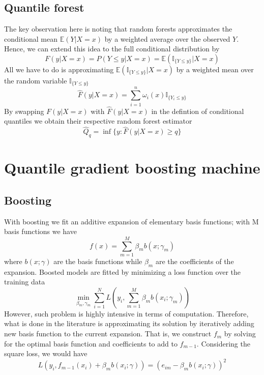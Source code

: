 \subsection{Quantile forest}
The key observation here is noting that random forests approximates the conditional mean $\mathbb{E}(Y|X=x)$ by a weighted average over the observed $Y$. Hence, we can extend this idea to the full conditional distribution by
\begin{equation}
    F(y|X=x)=P(Y\leq y|X=x)=\mathbb{E}(\mathbb{I}_{\{Y\leq y\}}|X=x)
\end{equation}
All we have to do is approximating $\mathbb{E}(\mathbb{I}_{\{Y\leq y\}}|X=x)$ by a weighted mean over the random variable $\mathbb{I}_{\{Y\leq y\}}$
\begin{equation}
    \hat{F}(y|X=x)=\sum\limits_{i=1}^{n}\omega_i(x)\mathbb{I}_{\{Y_i\leq y\}}
\end{equation}
By swapping $F(y|X=x)$ with $\hat{F}(y|X=x)$ in the defintion of conditional quantiles we obtain their respective random forest estimator
\begin{equation}
    \hat{Q}_q=\inf\{y:\hat{F}(y|X=x)\geq q\}
\end{equation}


\section{Quantile gradient boosting machine}
\subsection{Boosting}
With boosting we fit an additive expansion of elementary basis functions; with M basis functions we have 
\begin{equation}
    f(x)=\sum\limits_{m=1}^{M}\beta_m b(x;\gamma_m)
\end{equation}
where $b(x;\gamma)$ are the basis functions while $\beta_m$ are the coefficients of the expansion.
Boosted models are fitted by minimizing a loss function over the training data
\begin{equation}
    \min_{\beta_m, \gamma_m}\sum\limits_{i=1}^{N}L\left(y_i, \sum\limits_{m=1}^M \beta_m b(x_i;\gamma_m)\right)
\end{equation}
However, such problem is highly intensive in terms of computation. Therefore, what is done in the literature is approximating its solution by iteratively adding new basis function to the current expansion. That is, we construct $f_m$ by solving for the optimal basis function and coefficients to add to $f_{m-1}$. Considering the square loss, we would have
\begin{equation}
    L(y_i, f_{m-1}(x_i)+\beta_m b(x_i;\gamma))=(e_{im}-\beta_m b(x_i;\gamma))^2
\end{equation}


